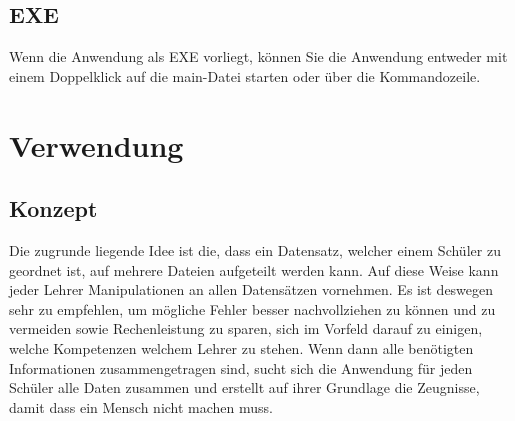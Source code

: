 \documentclass[a4paper,10pt]{scrartcl}
\begin{document}
   \subsection{EXE}
      Wenn die Anwendung als EXE vorliegt, können Sie die Anwendung entweder mit einem Doppelklick auf die main-Datei starten oder über die Kommandozeile.

\section{Verwendung}
   \subsection{Konzept}
     Die zugrunde liegende Idee ist die, dass ein Datensatz, welcher einem Schüler zu geordnet ist, auf mehrere Dateien aufgeteilt werden kann. Auf diese Weise kann jeder Lehrer Manipulationen an allen Datensätzen vornehmen. Es ist deswegen sehr zu empfehlen, um mögliche Fehler besser nachvollziehen zu können und zu vermeiden sowie Rechenleistung zu sparen, sich im Vorfeld darauf zu einigen, welche Kompetenzen welchem Lehrer zu stehen. \newline
     Wenn dann alle benötigten Informationen zusammengetragen sind, sucht sich die Anwendung für jeden Schüler alle Daten zusammen und erstellt auf ihrer Grundlage die Zeugnisse, damit dass ein Mensch nicht machen muss.
\end{document}
